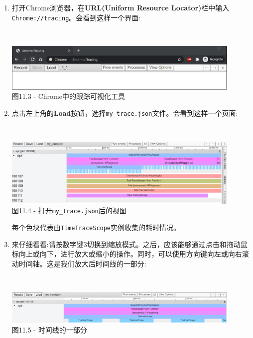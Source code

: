 \begin{enumerate}
\item 打开Chrome浏览器，在\textbf{URL(Uniform Resource Locator)}栏中输入\texttt{Chrome://tracing}。会看到这样一个界面:

\hspace*{\fill} \\ %
\begin{center}
\includegraphics[width=0.9\textwidth]{content/3/chapter11/images/3.png}\\
图11.3 - Chrome中的跟踪可视化工具
\end{center}

\item 点击左上角的\textbf{Load}按钮，选择\texttt{my\_trace.json}文件。会看到这样一个页面:

\hspace*{\fill} \\ %
\begin{center}
\includegraphics[width=0.9\textwidth]{content/3/chapter11/images/4.png}\\
图11.4 - 打开\texttt{my\_trace.json}后的视图
\end{center}

每个色块代表由\texttt{TimeTraceScope}实例收集的耗时情况。

\item 来仔细看看:请按数字键3切换到缩放模式。之后，应该能够通过点击和拖动鼠标向上或向下，进行放大或缩小的操作。同时，可以使用方向键向左或向右滚动时间轴。这是我们放大后时间线的一部分:

\hspace*{\fill} \\ %
\begin{center}
\includegraphics[width=0.9\textwidth]{content/3/chapter11/images/5.png}\\
图11.5 - 时间线的一部分
\end{center}


\end{enumerate}
